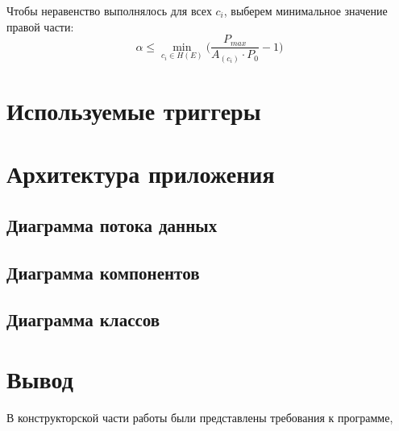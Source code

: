 Чтобы неравенство выполнялось для всех $c_i$, выберем минимальное значение правой части:
\begin{equation}
	\alpha \le \min_{c_i \in H(E)}{\Big(\frac{P_{max}}{A_(c_i) \cdot P_0} - 1\Big)}
\end{equation}

\section{Используемые триггеры}

\section{Архитектура приложения}

\subsection{Диаграмма потока данных}

\subsection{Диаграмма компонентов}

\subsection{Диаграмма классов}


\section{Вывод}

В конструкторской части работы были представлены требования к программе, 

\clearpage
